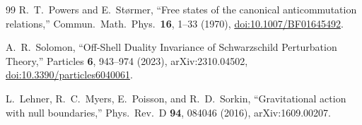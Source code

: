 \documentclass[onecolumn,11pt,aps,prd,amsmath,amssymb,nofootinbib,floatfix]{revtex4-2}
\begin{document}
\begin{thebibliography}{99}
R.~T.~Powers and E.~St\o rmer, ``Free states of the canonical anticommutation relations,'' Commun.\ Math.\ Phys.\ \textbf{16}, 1--33 (1970), \href{https://doi.org/10.1007/BF01645492}{doi:10.1007/BF01645492}.

A.~R.~Solomon, ``Off-Shell Duality Invariance of Schwarzschild Perturbation Theory,'' Particles \textbf{6}, 943--974 (2023), arXiv:2310.04502, \href{https://doi.org/10.3390/particles6040061}{doi:10.3390/particles6040061}.

L.~Lehner, R.~C.~Myers, E.~Poisson, and R.~D.~Sorkin, ``Gravitational action with null boundaries,'' Phys.\ Rev.\ D \textbf{94}, 084046 (2016), arXiv:1609.00207.

\end{thebibliography}
\end{document}
